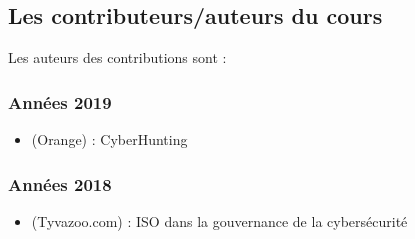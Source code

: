 

\subsection{Les contributeurs/auteurs du cours}

Les auteurs des contributions sont :

\subsubsection{Années 2019}

\begin{itemize}
  \item {} (Orange) : CyberHunting
\end{itemize}


\subsubsection{Années 2018}

\begin{itemize}
  \item {} (Tyvazoo.com) : ISO dans la gouvernance de la cybersécurité
\end{itemize}

